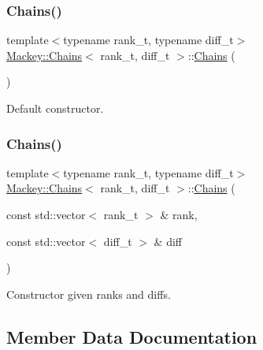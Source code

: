 \subsubsection{\texorpdfstring{Chains()}{Chains()}\hspace{0.1cm}{\footnotesize\ttfamily [1/2]}}
{\footnotesize\ttfamily template$<$typename rank\+\_\+t, typename diff\+\_\+t$>$ \\
\hyperlink{classMackey_1_1Chains}{Mackey\+::\+Chains}$<$ rank\+\_\+t, diff\+\_\+t $>$\+::\hyperlink{classMackey_1_1Chains}{Chains} (\begin{DoxyParamCaption}{ }\end{DoxyParamCaption})\hspace{0.3cm}{\ttfamily [inline]}}



Default constructor. 

\mbox{\label{classMackey_1_1Chains_a23e36ad0f810adeecad83b87b7034335}} 
\subsubsection{\texorpdfstring{Chains()}{Chains()}\hspace{0.1cm}{\footnotesize\ttfamily [2/2]}}
{\footnotesize\ttfamily template$<$typename rank\+\_\+t, typename diff\+\_\+t$>$ \\
\hyperlink{classMackey_1_1Chains}{Mackey\+::\+Chains}$<$ rank\+\_\+t, diff\+\_\+t $>$\+::\hyperlink{classMackey_1_1Chains}{Chains} (\begin{DoxyParamCaption}\item[{const std\+::vector$<$ rank\+\_\+t $>$ \&}]{rank,  }\item[{const std\+::vector$<$ diff\+\_\+t $>$ \&}]{diff }\end{DoxyParamCaption})\hspace{0.3cm}{\ttfamily [inline]}}



Constructor given ranks and diffs. 



\subsection{Member Data Documentation}
\mbox{\label{classMackey_1_1Chains_a9ccee2cbb3daa1e82bab920aeef59516}} 
